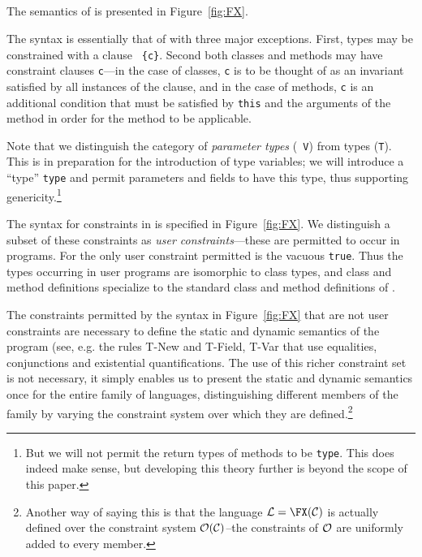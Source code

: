 \subsection{\FXZ}
The semantics of \FXZ{} is presented in Figure~\ref{fig:FX}. 

The syntax is essentially that of \FJ{} with three major
exceptions. First, types may be constrained with a clause {\tt
\{c\}}. Second both classes and methods may have constraint clauses
{\tt c}---in the case of classes, {\tt c} is to be thought of as an
invariant satisfied by all instances of the clause, and in the case of
methods, {\tt c} is an additional condition that must be satisfied by
{\tt this} and the arguments of the method in order for the method to
be applicable. 

Note that we distinguish the category of {\em parameter types} ({\tt
V}) from types ({\tt T}). This is in preparation for the introduction
of type variables; we will introduce a ``type'' {\tt type} and permit
parameters and fields to have this type, thus supporting
genericity.\footnote{But we will not permit the return types of
methods to be {\tt type}. This does indeed make sense, but developing
this theory further is beyond the scope of this paper.}

The syntax for constraints in \FXZ{} is specified in
Figure~\ref{fig:FX}. We distinguish a subset of these constraints as
{\em user constraints}---these are permitted to occur in
programs. For \FXZ{} the only user constraint permitted is the vacuous
{\tt true}. Thus the types occurring in user programs are isomorphic
to class types, and class and method definitions specialize to the
standard class and method definitions of \FJ{}. 

The constraints permitted by the syntax in Figure~\ref{fig:FX} that
are not user constraints are necessary to define the static and
dynamic semantics of the program (see, e.g.{} the rules {\sc T-New}
and {\sc T-Field}, {\sc T-Var} that use equalities, conjunctions and
existential quantifications. The use of this richer constraint set is
not necessary, it simply enables us to present the static and dynamic
semantics once for the entire family of \FX{} languages,
distinguishing different members of the family by varying the
constraint system over which they are defined.\footnote{Another way of
saying this is that the language ${\cal L}=\FX({\cal C})$ is actually
defined over the constraint system ${\cal O}({\cal C})$--the constraints
of $\cal O$ are uniformly added to every \FX{} member.}

